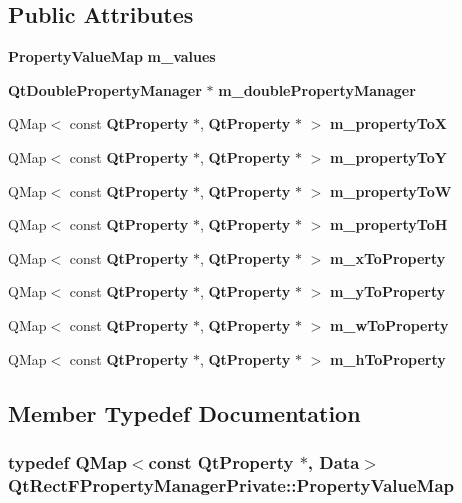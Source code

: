 \subsection*{Public Attributes}
\begin{DoxyCompactItemize}
\item 
{\bf Property\+Value\+Map} {\bf m\+\_\+values}
\item 
{\bf Qt\+Double\+Property\+Manager} $\ast$ {\bf m\+\_\+double\+Property\+Manager}
\item 
Q\+Map$<$ const {\bf Qt\+Property} $\ast$, {\bf Qt\+Property} $\ast$ $>$ {\bf m\+\_\+property\+ToX}
\item 
Q\+Map$<$ const {\bf Qt\+Property} $\ast$, {\bf Qt\+Property} $\ast$ $>$ {\bf m\+\_\+property\+ToY}
\item 
Q\+Map$<$ const {\bf Qt\+Property} $\ast$, {\bf Qt\+Property} $\ast$ $>$ {\bf m\+\_\+property\+ToW}
\item 
Q\+Map$<$ const {\bf Qt\+Property} $\ast$, {\bf Qt\+Property} $\ast$ $>$ {\bf m\+\_\+property\+ToH}
\item 
Q\+Map$<$ const {\bf Qt\+Property} $\ast$, {\bf Qt\+Property} $\ast$ $>$ {\bf m\+\_\+x\+To\+Property}
\item 
Q\+Map$<$ const {\bf Qt\+Property} $\ast$, {\bf Qt\+Property} $\ast$ $>$ {\bf m\+\_\+y\+To\+Property}
\item 
Q\+Map$<$ const {\bf Qt\+Property} $\ast$, {\bf Qt\+Property} $\ast$ $>$ {\bf m\+\_\+w\+To\+Property}
\item 
Q\+Map$<$ const {\bf Qt\+Property} $\ast$, {\bf Qt\+Property} $\ast$ $>$ {\bf m\+\_\+h\+To\+Property}
\end{DoxyCompactItemize}


\subsection{Member Typedef Documentation}
\subsubsection[{Property\+Value\+Map}]{\setlength{\rightskip}{0pt plus 5cm}typedef Q\+Map$<$const {\bf Qt\+Property} $\ast$, {\bf Data}$>$ {\bf Qt\+Rect\+F\+Property\+Manager\+Private\+::\+Property\+Value\+Map}}\label{classQtRectFPropertyManagerPrivate_ac218b6df7e1190fa50a3292cfbdfe7ce}


